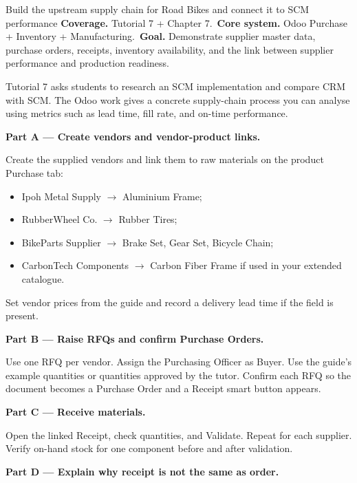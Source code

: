 
\begin{labproject}{Build the upstream supply chain for Road Bikes and connect it to SCM performance}
\textbf{Coverage.} Tutorial 7 + Chapter 7.\
\textbf{Core system.} Odoo Purchase + Inventory + Manufacturing.\
\textbf{Goal.} Demonstrate supplier master data, purchase orders, receipts, inventory availability, and the link between supplier performance and production readiness.

\begin{labmode}
Tutorial 7 asks students to research an SCM implementation and compare CRM with SCM. The Odoo work gives a concrete supply-chain process you can analyse using metrics such as lead time, fill rate, and on-time performance.
\end{labmode}

\medskip\noindent\textbf{Part A --- Create vendors and vendor-product links.}

Create the supplied vendors and link them to raw materials on the product Purchase tab:
\begin{itemize}
  \item Ipoh Metal Supply $\rightarrow$ Aluminium Frame;
  \item RubberWheel Co. $\rightarrow$ Rubber Tires;
  \item BikeParts Supplier $\rightarrow$ Brake Set, Gear Set, Bicycle Chain;
  \item CarbonTech Components $\rightarrow$ Carbon Fiber Frame if used in your extended catalogue.
\end{itemize}

Set vendor prices from the guide and record a delivery lead time if the field is present.

\medskip\noindent\textbf{Part B --- Raise RFQs and confirm Purchase Orders.}

Use one RFQ per vendor. Assign the Purchasing Officer as Buyer. Use the guide's example quantities or quantities approved by the tutor. Confirm each RFQ so the document becomes a Purchase Order and a Receipt smart button appears.

\medskip\noindent\textbf{Part C --- Receive materials.}

Open the linked Receipt, check quantities, and Validate. Repeat for each supplier. Verify on-hand stock for one component before and after validation.

\medskip\noindent\textbf{Part D --- Explain why receipt is not the same as order.}


\end{labproject}

